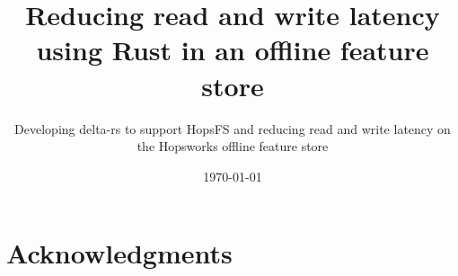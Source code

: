 \documentclass[nomenclature, english, bibtex]{kththesis}
\date{\today}
\title{Reducing read and write latency using Rust in an offline feature store}
\subtitle{Developing delta-rs to support HopsFS and reducing read and write latency on the Hopsworks offline feature store}
\begin{document}

\kthcover
\clearpage\thispagestyle{empty}\mbox{} %
\titlepage

\bookinfopage

\frontmatter
\setcounter{page}{1}

\begin{abstract}
    
\end{abstract}

\cleardoublepage

\begin{abstract}
   
\end{abstract}

\cleardoublepage

\begin{abstract}
    
\end{abstract}

\cleardoublepage

\section*{Acknowledgments}
    
\end{document}
